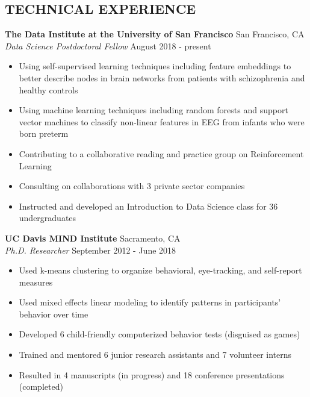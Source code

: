 \documentclass[line,margin,10pt]{res}
\begin{document}
\begin{resume}
\section{TECHNICAL EXPERIENCE}
\textbf{The Data Institute at the University of San Francisco} \hfill San Francisco, CA \\
{\sl Data Science Postdoctoral Fellow} \hfill August 2018 - present
\begin{itemize} \itemsep -2pt
\item Using self-supervised learning techniques including feature embeddings to better describe nodes in brain networks from patients with schizophrenia and healthy controls
\item Using machine learning techniques including random forests and support vector machines to classify non-linear features in EEG from infants who were born preterm
\item Contributing to a collaborative reading and practice group on Reinforcement Learning
\item Consulting on collaborations with 3 private sector companies
\item Instructed and developed an Introduction to Data Science class for 36 undergraduates
\end{itemize}

\textbf{UC Davis MIND Institute} \hfill Sacramento, CA \\
{\sl Ph.D. Researcher} \hfill September 2012 - June 2018
\begin{itemize} \itemsep -2pt
\item Used k-means clustering to organize behavioral, eye-tracking, and self-report measures
\item Used mixed effects linear modeling to identify patterns in participants' behavior over time
\item Developed 6 child-friendly computerized behavior tests (disguised as games)
\item Trained and mentored 6 junior research assistants and 7 volunteer interns
\item Resulted in 4 manuscripts (in progress) and 18 conference presentations (completed)
\end{itemize}


\end{resume}
\end{document}
